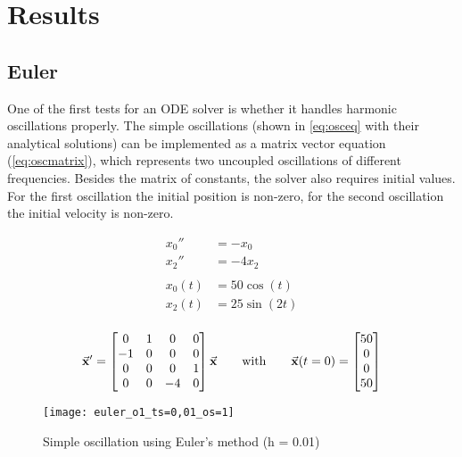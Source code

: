 \chapter{Results}
\label{s:results}

\section{Euler}
One of the first tests for an ODE solver is whether it handles harmonic oscillations properly. The simple oscillations (shown in \ref{eq:osceq} with their analytical solutions) can be implemented as a matrix vector equation (\ref{eq:oscmatrix}), which represents two uncoupled oscillations of different frequencies. Besides the matrix of constants, the solver also requires initial values. For the first oscillation the initial position is non-zero, for the second oscillation the initial velocity is non-zero. 

\begin{align}
\label{eq:osceq} \nonumber
x_{0} '' &= - x_{0} \\
x_{2} '' &= -4 x_{2} \\ \nonumber
\\ \nonumber
\label{eq:osceqsol} \nonumber
x_{0}(t)  &= 50 \cos{(t)} \\ \nonumber
x_{2}(t)  &= 25 \sin{(2t)} \\ \nonumber
\end{align}


\begin{equation}
\label{eq:oscmatrix}
\vec{\mathbf{x}}' = \begin{bmatrix} 
0 & 1 & 0 & 0 \\
-1 & 0 & 0 & 0 \\
0 & 0 & 0 & 1 \\
0 & 0 & -4 & 0 \\
\end{bmatrix} \vec{\mathbf{x}} 
\hspace{20pt} \text{with} \hspace{20pt} 
\vec{\mathbf{x}}(t = 0) =\begin{bmatrix} 50 \\ 0 \\ 0 \\ 50 \end{bmatrix} 
\end{equation}


\begin{figure}[h]
	\centering
	\texttt{[image: euler\_o1\_ts=0,01\_os=1]}
	\caption{Simple oscillation using Euler's method (h = 0.01)}
	\label{f:euler_o1_ts=0,01_os=1}
\end{figure}

